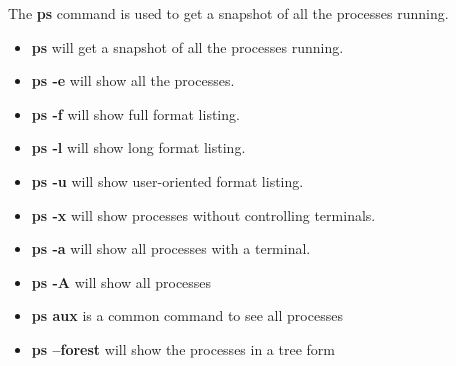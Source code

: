 \begin{ans}
  The \textbf{ps} command is used to get a snapshot of all the processes running.
  \begin{itemize}
    \item \textbf{ps} will get a snapshot of all the processes running.
    \item \textbf{ps -e} will show all the processes.
    \item \textbf{ps -f} will show full format listing.
    \item \textbf{ps -l} will show long format listing.
    \item \textbf{ps -u} will show user-oriented format listing.
    \item \textbf{ps -x} will show processes without controlling terminals.
    \item \textbf{ps -a} will show all processes with a terminal.
    \item \textbf{ps -A} will show all processes
    \item \textbf{ps aux} is a common command to see all processes
    \item \textbf{ps --forest} will show the processes in a tree form
  \end{itemize}
\end{ans}
